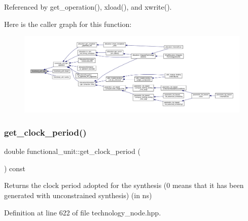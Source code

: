 Referenced by get\+\_\+operation(), xload(), and xwrite().

Here is the caller graph for this function\+:
\nopagebreak
\begin{figure}[H]
\begin{center}
\leavevmode
\includegraphics[width=350pt]{d8/dd6/structfunctional__unit_a8f9bce347984b438b96be67920000437_icgraph}
\end{center}
\end{figure}
\mbox{\label{structfunctional__unit_a42c1f8deae0697b03a865e843c41f3fb}} 
\subsubsection{\texorpdfstring{get\+\_\+clock\+\_\+period()}{get\_clock\_period()}}
{\footnotesize\ttfamily double functional\+\_\+unit\+::get\+\_\+clock\+\_\+period (\begin{DoxyParamCaption}{ }\end{DoxyParamCaption}) const\hspace{0.3cm}{\ttfamily [inline]}}



Returns the clock period adopted for the synthesis (0 means that it has been generated with unconstrained synthesis) (in ns) 



Definition at line 622 of file technology\+\_\+node.\+hpp.

\mbox{\label{structfunctional__unit_af725411ddb7e1a3a512eabe3876bccf5}} 
